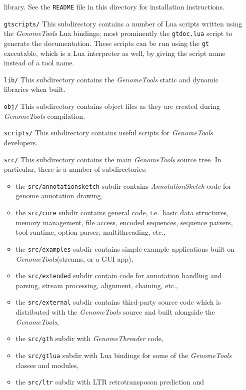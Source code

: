 \documentclass[11pt,final]{article}
\newcommand{\Gt}[0]{\emph{GenomeTools}\xspace}
\begin{document}
\begin{itemize}
     library. See the \texttt{README} file in this directory for installation
     instructions.
\item[\texttt{gtscripts/}]
     This subdirectory contains a number of Lua scripts written using the \Gt
     Lua bindings; most prominently the \texttt{gtdoc.lua} script to generate
     the documentation. These scripts can be run using the \texttt{gt}
     executable, which is a Lua interpreter as well, by giving the script name
     instead of a tool name.
\item[\texttt{lib/}]
     This subdirectory contains the \Gt static and dynamic libraries when built.
\item[\texttt{obj/}]
     This subdirectory contains object files as they are created during \Gt
     compilation.
\item[\texttt{scripts/}]
     This subdirectory contains useful scripts for \Gt developers.
\item[\texttt{src/}]
     This subdirectory contains the main \Gt source tree. In particular, there
     is a number of subdirectories:
     \begin{itemize}
       \item the \texttt{src/annotationsketch} subdir contains
             \emph{AnnotationSketch} code for genome annotation drawing,
       \item the \texttt{src/core} subdir contains general code, i.e.\
             basic data structures, memory management, file access, encoded
             sequences, sequence parsers, tool runtime, option parser,
             multithreading, etc.,
       \item the \texttt{src/examples} subdir contains simple example
             applications built on \Gt (streams, or a GUI app),
       \item the \texttt{src/extended} subdir contain code for annotation
             handling and parsing, stream processing, alignment, chaining, etc.,
       \item the \texttt{src/external} subdir contains third-party source code
             which is distributed with the \Gt source and built alongside the
             \Gt ,
       \item the \texttt{src/gth} subdir with \emph{GenomeThreader} code,
       \item the \texttt{src/gtlua} subdir with Lua bindings for some of the \Gt
             classes and modules,
       \item the \texttt{src/ltr} subdir with LTR retrotransposon prediction and

\end{itemize}
\end{itemize}
\end{document}
